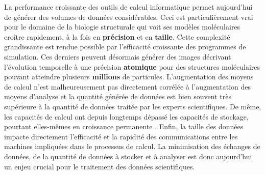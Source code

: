 La performance croissante des outils de calcul informatique permet aujourd'hui de générer des volumes de données considérables. Ceci est particulièrement vrai pour le domaine de la biologie structurale qui voit ses modèles moléculaires croître rapidement, à la fois en \textbf{précision} et en \textbf{taille}. Cette complexité grandissante est rendue possible par l'efficacité croissante des programmes de simulation. Ces derniers peuvent désormais générer des images décrivant l'évolution temporelle à une précision \textbf{atomique} pour des structures moléculaires pouvant atteindre plusieurs \textbf{millions} de particules. L'augmentation des moyens de calcul n'est malheureusement pas directement corrélée à l'augmentation des moyens d'analyse et la quantité générée de données est bien souvent très supérieure à la quantité de données traitée par les experts scientifiques. De même, les capacités de calcul ont depuis longtemps dépassé les capacités de stockage, pourtant elles-mêmes en croissance permanente \cite{zimmerman2014data}. Enfin, la taille des données impacte directement l'efficacité et la rapidité des communications entre les machines impliquées dans le processus de calcul. La minimisation des échanges de données, de la quantité de données à stocker et à analyser est donc aujourd'hui un enjeu crucial pour le traitement des données scientifiques.

